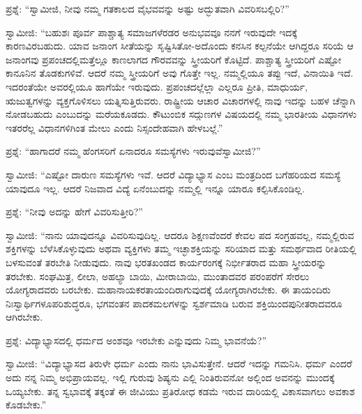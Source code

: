 \vskip 5pt

ಪ್ರಶ್ನೆ: “ಸ್ವಾಮೀಜಿ, ನೀವು ನಮ್ಮ ಗತಕಾಲದ ವೈಭವವನ್ನು ಅಷ್ಟು ಅದ್ಭುತವಾಗಿ ವಿವರಿಸಬಲ್ಲಿರಿ?”

\vskip 5pt

ಸ್ವಾಮೀಜಿ: “ಬಹುಶಃ ಪೂರ್ವ ಪಾಶ್ಚಾತ್ಯ ಸಮಾಜಗಳೆರಡರ ಅನುಭವವೂ ನನಗೆ ಇರುವುದೇ ಇದಕ್ಕೆ ಕಾರಣವಿರಬಹುದು. ಯಾವ ಜನಾಂಗ ಸೀತೆಯನ್ನು ಸೃಷ್ಟಿಸಿತೋ-ಅದೊಂದು ಕನಸಿನ ಕಲ್ಪನೆಯೇ ಆಗಿದ್ದರೂ ಸರಿಯೆ ಆ ಜನಾಂಗವು ಪ್ರಪಂಚದಲ್ಲಿ\break ಮತ್ತೆಲ್ಲೂ ಕಾಣಲಾಗದ ಗೌರವವನ್ನು ಸ್ತ್ರೀಯರಿಗೆ ಕೊಟ್ಟಿದೆ. ಪಾಶ್ಚಾತ್ಯ ಸ್ತ್ರೀಯರಿಗೆ ಎಷ್ಟೋ ಕಾನೂನಿನ ತೊಡಕುಗಳಿವೆ. ಆದರೆ ನಮ್ಮ ಸ್ತ್ರೀಯರಿಗೆ ಅವು ಗೊತ್ತೇ ಇಲ್ಲ. ನಮ್ಮಲ್ಲಿಯೂ ತಪ್ಪು ಇದೆ, ವಿನಾಯಿತಿ ಇದೆ. ಇದರಂತೆಯೇ ಅವರಲ್ಲಿಯೂ ಹಾಗೆಯೇ ಇರುವುದು. ಪ್ರಪಂಚದಲ್ಲೆಲ್ಲಾ ಎಲ್ಲರೂ ಪ್ರೀತಿ, ಮಾಧುರ್ಯ, ಋಜುತ್ವಗಳನ್ನು ವ್ಯಕ್ತಗೊಳಿಸಲು ಯತ್ನಿಸುತ್ತಿರುವರು. ರಾಷ್ಟ್ರೀಯ ಆಚಾರ ವಿಚಾರಗಳಲ್ಲಿ ನಾವು ಇದನ್ನು ಬಹಳ ಚೆನ್ನಾಗಿ ನೋಡಬಹುದು ಎಂಬುದನ್ನು ಮರೆಯಕೂಡದು. ಕೌಟುಂಬಿಕ ಸದ್ಗುಣಗಳ ವಿಷಯದಲ್ಲಿ ನಮ್ಮ ಭಾರತೀಯ ವಿಧಾನಗಳು ಇತರರೆಲ್ಲ ವಿಧಾನಗಳಿಗಿಂತ ಮೇಲು ಎಂದು ನಿಸ್ಸಂದೇಹವಾಗಿ ಹೇಳಬಲ್ಲೆ.”

\vskip 5pt

ಪ್ರಶ್ನೆ: “ಹಾಗಾದರೆ ನಮ್ಮ ಹೆಂಗಸರಿಗೆ ಏನಾದರೂ ಸಮಸ್ಯೆಗಳು ಇರುವುವೆ\break ಸ್ವಾಮೀಜಿ?”

\vskip 5pt

ಸ್ವಾಮೀಜಿ: “ಎಷ್ಟೋ ದಾರುಣ ಸಮಸ್ಯೆಗಳು ಇವೆ. ಆದರೆ ವಿದ್ಯಾಭ್ಯಾಸ ಎಂಬ ಮಂತ್ರದಿಂದ ಬಗೆಹರಿಯದ ಸಮಸ್ಯೆ ಯಾವುದೂ ಇಲ್ಲ. ಆದರೆ ನಿಜವಾದ ವಿದ್ಯೆ ಏನೆಂಬುದನ್ನು ನಮ್ಮಲ್ಲಿ ಇನ್ನೂ ಯಾರೂ ಕಲ್ಪಿಸಿಕೊಂಡಿಲ್ಲ.

\vskip 5pt

ಪ್ರಶ್ನೆ: “ನೀವು ಅದನ್ನು ಹೇಗೆ ವಿವರಿಸುತ್ತೀರಿ?”

\eject

ಸ್ವಾಮೀಜಿ: “ನಾನು ಯಾವುದನ್ನೂ ವಿವರಿಸುವುದಿಲ್ಲ. ಆದರೂ ಶಿಕ್ಷಣವೆಂದರೆ ಕೇವಲ ಪದ ಸಂಗ್ರಹವಲ್ಲ, ನಮ್ಮಲ್ಲಿರುವ ಶಕ್ತಿಗಳನ್ನು ಬೆಳೆಸಿಕೊಳ್ಳುವುದು ಅಥವಾ ವ್ಯಕ್ತಿಗಳು ತಮ್ಮ ಇಚ್ಛಾಶಕ್ತಿಯನ್ನು ಸರಿಯಾದ ಮತ್ತು ಸಮರ್ಥವಾದ ರೀತಿಯಲ್ಲಿ ಬಳಸುವಂತೆ ತರಬೇತಿ ನೀಡುವುದು. ನಾವು ಭರತಖಂಡದ ಕಾರ್ಯರಂಗಕ್ಕೆ ನಿರ್ಭೀತರಾದ ಮಹಾ ಸ್ತ್ರೀಯರನ್ನು ತರಬೇಕು. ಸಂಘಮಿತ್ರ, ಲೀಲಾ, ಅಹಲ್ಯಾ ಬಾಯಿ, ಮೀರಾಬಾಯಿ, ಮುಂತಾದವರ ಪರಂಪರೆಗೆ ಸೇರಲು ಯೋಗ್ಯರಾದವರು ಬರಬೇಕು. ಮಹಾನಾಯಕರ\break ತಾಯಂದಿರಾಗುವುದಕ್ಕೆ ಯೋಗ್ಯರಾಗಿರಬೇಕು. ಈ ತಾಯಂದಿರು ನಿಃಸ್ವಾರ್ಥಿಗಳೂ\break ಪರಿಶುದ್ಧರೂ, ಭಗವಂತನ ಪಾದಕಮಲಗಳನ್ನು ಸ್ವರ್ಶಮಾಡಿ ಬರುವ ಶಕ್ತಿಯಿಂದ\break ಪುನೀತರಾದವರೂ ಆಗಿರಬೇಕು.

\vskip 5pt

ಪ್ರಶ್ನೆ: ವಿದ್ಯಾಭ್ಯಾಸದಲ್ಲಿ ಧರ್ಮದ ಅಂಶವೂ ಇರಬೇಕು ಎನ್ನುವುದು ನಿಮ್ಮ ಭಾವನೆಯೆ?”

\vskip 5pt

ಸ್ವಾಮೀಜಿ: “ವಿದ್ಯಾಭ್ಯಾಸದ ತಿರುಳೇ ಧರ್ಮ ಎಂದು ನಾನು ಭಾವಿಸುತ್ತೇನೆ. ಆದರೆ ಇದನ್ನು ಗಮನಿಸಿ. ಧರ್ಮ ಎಂದರೆ ಅದು ನನ್ನ ನಿಮ್ಮ ಅಭಿಪ್ರಾಯವಲ್ಲ. ಇಲ್ಲಿ ಗುರುವು ಶಿಷ್ಯನು ಎಲ್ಲಿ ನಿಂತಿರುವನೋ ಅಲ್ಲಿಂದ ಅವನನ್ನು ಮುಂದಕ್ಕೆ ಒಯ್ಯಬೇಕು. ತನ್ನ ಸ್ವಭಾವಕ್ಕೆ ತಕ್ಕಂತೆ ಈ ಜೀವಿಯು ಪ್ರತಿರೋಧ ಕಡಮೆ ಇರುವ ದಾರಿಯಲ್ಲಿ ವಿಕಾಸವಾಗಲು ಅವಕಾಶ ಕೊಡಬೇಕು.”

